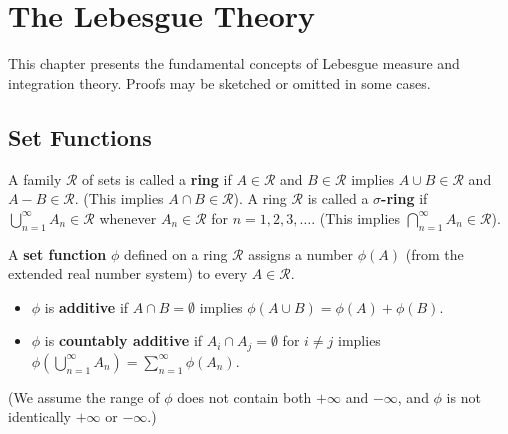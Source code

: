 
\chapter{The Lebesgue Theory}
\label{chap:rudin11}

This chapter presents the fundamental concepts of Lebesgue measure
and integration theory. Proofs may be sketched or omitted in some cases.

\section{Set Functions}


\begin{definition}
  \label{def:chap11:ring_sigma_ring}
  A family $\mathcal{R}$ of sets is called a \textbf{ring} if $A \in
  \mathcal{R}$ and $B \in \mathcal{R}$ implies $A \cup B \in
  \mathcal{R}$ and $A - B \in \mathcal{R}$. (This implies $A \cap B
  \in \mathcal{R}$).
  A ring $\mathcal{R}$ is called a \textbf{$\sigma$-ring} if
  $\bigcup_{n=1}^\infty A_n \in \mathcal{R}$ whenever $A_n \in
  \mathcal{R}$ for $n=1, 2, 3, \dots$. (This implies
  $\bigcap_{n=1}^\infty A_n \in \mathcal{R}$).
\end{definition}

\begin{definition}
  \label{def:chap11:set_function_additive}
  A \textbf{set function} $\phi$ defined on a ring $\mathcal{R}$
  assigns a number $\phi(A)$ (from the extended real number system)
  to every $A \in \mathcal{R}$.
  \begin{itemize}
    \item $\phi$ is \textbf{additive} if $A \cap B = \emptyset$
      implies $\phi(A \cup B) = \phi(A) + \phi(B)$.
    \item $\phi$ is \textbf{countably additive} if $A_i \cap A_j =
      \emptyset$ for $i \ne j$ implies $\phi(\bigcup_{n=1}^\infty
      A_n) = \sum_{n=1}^\infty \phi(A_n)$.
  \end{itemize}
  (We assume the range of $\phi$ does not contain both $+\infty$ and
  $-\infty$, and $\phi$ is not identically $+\infty$ or $-\infty$.)
\end{definition}

